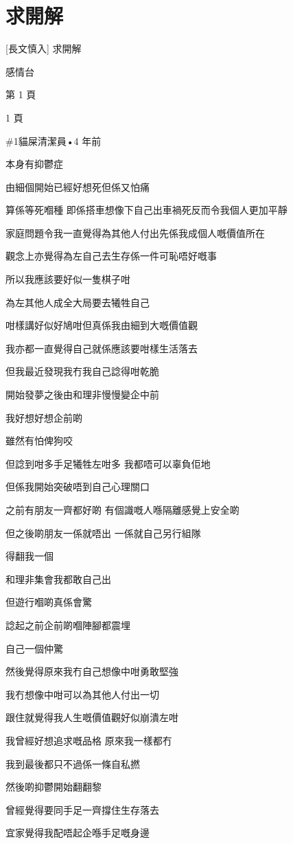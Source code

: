 \chapter{求開解}

[長文慎入] 求開解

感情台

第 1 頁

1 頁

\#1貓屎清潔員•4 年前

本身有抑鬱症

由細個開始已經好想死但係又怕痛

算係等死嗰種 即係搭車想像下自己出車禍死反而令我個人更加平靜

家庭問題令我一直覺得為其他人付出先係我成個人嘅價值所在

觀念上亦覺得為左自己去生存係一件可恥唔好嘅事

所以我應該要好似一隻棋子咁

為左其他人成全大局要去犧牲自己

咁樣講好似好鳩咁但真係我由細到大嘅價值觀

我亦都一直覺得自己就係應該要咁樣生活落去

但我最近發現我冇我自己諗得咁乾脆

開始發夢之後由和理非慢慢變企中前

我好想好想企前啲

雖然有怕俾狗咬

但諗到咁多手足犧牲左咁多 我都唔可以辜負佢地

但係我開始突破唔到自己心理關口

之前有朋友一齊都好啲 有個識嘅人喺隔離感覺上安全啲

但之後啲朋友一係就唔出 一係就自己另行組隊

得翻我一個

和理非集會我都敢自己出

但遊行嗰啲真係會驚

諗起之前企前啲嗰陣腳都震埋

自己一個仲驚

然後覺得原來我冇自己想像中咁勇敢堅強

我冇想像中咁可以為其他人付出一切

跟住就覺得我人生嘅價值觀好似崩潰左咁

我曾經好想追求嘅品格 原來我一樣都冇

我到最後都只不過係一條自私撚

然後啲抑鬱開始翻翻黎

曾經覺得要同手足一齊撐住生存落去

宜家覺得我配唔起企喺手足嘅身邊

